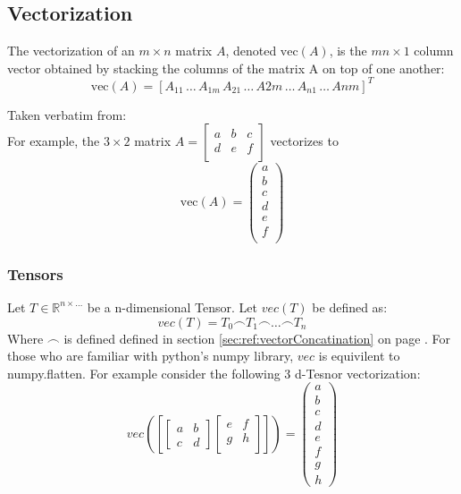 \documentclass[12pt]{article}
\newcommand{\sectionref}[1]{section \ref{#1} on page \pageref{#1}}
\begin{document}
\subsection{Vectorization}  \label{sec:ref:vectorization}
The vectorization of an \(m \times n\) matrix \(A\), denoted \(\text{vec}(A)\), is the \(mn \times 1\) column vector obtained by stacking the columns of the matrix A on top of one another: 
\begin{equation}\label{eq:ref:vectorization}
\text{vec}(A) = \left[
A_{11}\,\dots\,A_{1m}\,A_{21}\,\dots \,A{2m}\,\dots\,A_{n1}\,\dots\,A{nm}
\right]^T
\end{equation}

Taken verbatim from:\cite{vectorization_2021}\\
For example, the \(3\times 2\) matrix \(A=\left[
\begin{matrix}
a & b & c\\
d & e & f\\
\end{matrix}
\right]\) vectorizes to
\[
\text{vec}(A) = \left(
\begin{matrix}
a\\
b\\
c\\
d\\
e\\
f\\
\end{matrix}
\right)
\]
\subsubsection{Tensors}\label{sec:ref:vectorization:tensor}
Let \(T \in \mathbb R^{n \times\dots}\) be a n-dimensional Tensor.
Let \(vec(T)\) be defined as:
\begin{equation}
vec(T) = T_0 \frown T_1 \frown \dots \frown T_n
\end{equation}
Where \(\frown\) is defined defined in \sectionref{sec:ref:vectorConcatination}. For those who are familiar with python's numpy library, \(vec\) is equivilent to numpy.flatten. For example consider the following 3 d-Tesnor vectorization:
\[
vec
\left(\left[ 
\begin{bmatrix}
a & b \\
c & d
\end{bmatrix}
\begin{bmatrix}
e & f \\
g & h\\
\end{bmatrix}
\right]\right) = \left(\begin{matrix}
a \\ b \\ c \\d \\ e \\ f \\ g \\h
\end{matrix}\right)
\]
\end{document}
